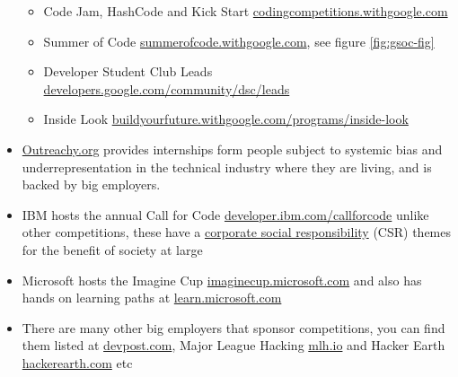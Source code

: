 \documentclass[
]{book}
\providecommand{\tightlist}{%
  \setlength{\itemsep}{0pt}\setlength{\parskip}{0pt}}
\begin{document}
\begin{itemize}
  \begin{itemize}
  \tightlist
  \item
    Code Jam, HashCode and Kick Start \href{https://codingcompetitions.withgoogle.com/}{codingcompetitions.withgoogle.com}
  \item
    Summer of Code \href{https://summerofcode.withgoogle.com/}{summerofcode.withgoogle.com}, see figure \ref{fig:gsoc-fig} \citep{gsoc}
  \item
    Developer Student Club Leads \href{https://developers.google.com/community/dsc/leads}{developers.google.com/community/dsc/leads}
  \item
    Inside Look \href{https://buildyourfuture.withgoogle.com/programs/inside-look/}{buildyourfuture.withgoogle.com/programs/inside-look}
  \end{itemize}
\item
  \href{https://www.outreachy.org/}{Outreachy.org} provides internships form people subject to systemic bias and underrepresentation in the technical industry where they are living, and is backed by big employers.
\item
  IBM hosts the annual Call for Code \href{https://developer.ibm.com/callforcode}{developer.ibm.com/callforcode} unlike other competitions, these have a \href{https://en.wikipedia.org/wiki/Corporate_social_responsibility}{corporate social responsibility} (CSR) themes for the benefit of society at large
\item
  Microsoft hosts the Imagine Cup \href{https://imaginecup.microsoft.com/}{imaginecup.microsoft.com} and also has hands on learning paths at \href{https://learn.microsoft.com/}{learn.microsoft.com}
\item
  There are many other big employers that sponsor competitions, you can find them listed at \href{https://devpost.com}{devpost.com}, Major League Hacking \href{https://mlh.io/}{mlh.io} and Hacker Earth \href{https://www.hackerearth.com/}{hackerearth.com} etc
\end{itemize}
\end{document}
